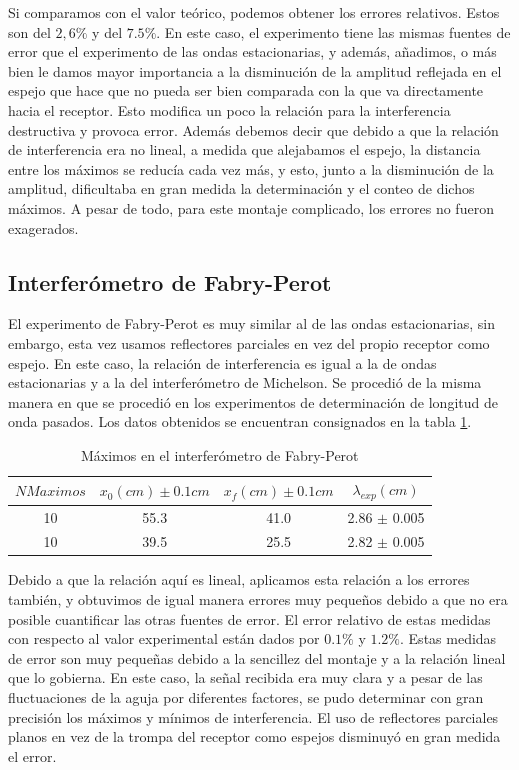 \documentclass[%
 reprint,
 amsmath,amssymb,
 aps,
]{revtex4-1}
\begin{document}
Si comparamos con el valor teórico, podemos obtener los errores relativos. Estos son del $2,6\%$ y del 
$7.5\%$. En este caso, el experimento tiene las mismas fuentes de error que el experimento de las ondas estacionarias, y además, añadimos, o más bien le damos mayor importancia a la disminución de la amplitud reflejada en el espejo que hace que no pueda ser bien comparada con la que va directamente hacia el receptor. Esto modifica un poco la relación para la interferencia destructiva y provoca error. Además debemos decir que debido a que la relación de interferencia era no lineal, a medida que alejabamos el espejo, la distancia entre los máximos se reducía cada vez más, y esto, junto a la disminución de la amplitud, dificultaba en gran medida la determinación y el conteo de dichos máximos. A pesar de todo, para este montaje complicado, los errores no fueron exagerados.\\

\subsection{\label{sec:level2}Interferómetro de Fabry-Perot}
El experimento de Fabry-Perot es muy similar al de las ondas estacionarias, sin embargo, esta vez usamos reflectores parciales en vez del propio receptor como espejo. En este caso, la relación de interferencia es igual a la de ondas estacionarias y a la del interferómetro de Michelson. Se procedió de la misma manera en que se procedió en los experimentos de determinación de longitud de onda pasados. Los datos obtenidos se encuentran consignados en la tabla \ref{table:Fabry}.\\

\begin{table}[h!]
\centering
 \begin{tabular}{|c|c|c|c|} 
 \hline
 $N Maximos$& $x_0(cm) \pm 0.1cm$ & $x_f(cm) \pm 0.1cm$ & $\lambda_{exp} (cm)$ \\ [0.5ex] 
 \hline\hline
 10 & 55.3 & 41.0 & 2.86 $\pm$ 0.005\\
 10 & 39.5 & 25.5 & 2.82 $\pm$ 0.005\\
[1ex] 
 \hline
 \end{tabular}
 \caption{Máximos en el interferómetro de Fabry-Perot}
 \label{table:Fabry}
\end{table}

Debido a que la relación aquí es lineal, aplicamos esta relación a los errores también, y obtuvimos de igual manera errores muy pequeños debido a que no era posible cuantificar las otras fuentes de error. El error relativo de estas medidas con respecto al valor experimental están dados por $0.1\%$ y $1.2\%$. Estas medidas de error son muy pequeñas debido a la sencillez del montaje y a la relación lineal que lo gobierna. En este caso, la señal recibida era muy clara y a pesar de las fluctuaciones de la aguja por diferentes factores, se pudo determinar con gran precisión los máximos y mínimos de interferencia. El uso de reflectores parciales planos en vez de la trompa del receptor como espejos disminuyó en gran medida el error. \\
\end{document}
